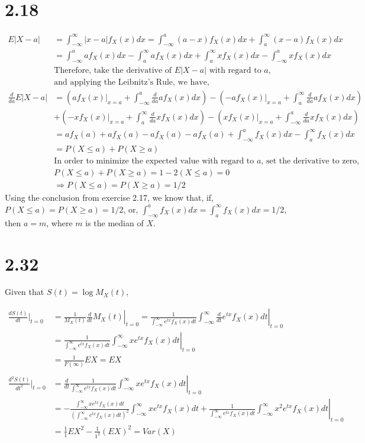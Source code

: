 \documentclass[letterpaper]{article}
\newcommand{\fx}{f_X(x)}
\newcommand{\fxd}{f_X(x)dx}
\newcommand{\intia}{\int_{-\infty}^a}
\newcommand{\intii}{\int_{-\infty}^\infty}
\newcommand{\intai}{\int_a^\infty}
\newcommand{\mgf}{M_X(t)}
\begin{document}
    \section*{2.18}
    \begin{align*}
    E|X-a| & = \int_{-\infty}^\infty |x-a| \fxd
    = \intia (a-x) \fxd + \intai (x-a) \fxd \\
    & = \intia a \fxd - \intai a \fxd + \intai x \fxd - \intia x \fxd \\
    & \text{Therefore, take the derivative of $E|X-a|$ with regard to $a$}, \\
    & \text{and applying the Leibnitz's Rule, we have,}\\
    \frac{d}{da}E|X-a| & = \left(a\fx |_{x=a} + \intia \frac{d}{da} a \fxd
    \right) 
    - \left(-a\fx|_{x=a} + \intai \frac{d}{da} a \fxd \right) \\
    & + \left(-x\fx|_{x=a} + \intai \frac{d}{da} x \fxd \right) 
    - \left(x\fx|_{x=a} + \intia \frac{d}{da} x \fxd \right) \\
    & = af_X(a) + a f_X(a) - af_X(a) - af_X(a) 
    + \intia \fxd - \intai \fxd \\
    & = P(X \le a) + P(X \ge a) \\
    & \text{In order to minimize the expected value with regard to $a$, set the derivative to zero,} \\
    & P(X \le a) + P(X \ge a) = 1 - 2(X \le a) = 0 \\
    & \Rightarrow P(X \le a) = P(X \ge a) = 1/2 
    \end{align*}
    Using the conclusion from exercise 2.17, we know that, if,
    $P(X \le a) = P(X \ge a) = 1/2$, or, $\intia \fxd = \intai \fxd = 1/2$,
    then $a = m$, where $m$ is the median of $X$.

    \section*{2.32}
    Given that $S(t) = \log \mgf$,

    \begin{align*}
    \frac{dS(t)}{dt}|_{t=0} & = \left. \frac{1}{\mgf} \frac{d}{dt} \mgf \right|_{t=0} 
    = \left.\frac{1}{\intii e^{tx}\fx dt} \intii \frac{d}{dt} e^{tx}\fx dt\right|_{t=0} \\
    & = \left. \frac{1}{\intii e^{tx}\fx dt} \intii x e^{tx}\fx dt\right|_{t=0} \\
    & = \frac{1}{F(\infty)} EX = EX\\
    \\
    \frac{d^2S(t)}{dt^2}|_{t=0} & =
    \left. \frac{d}{dt} \frac{1}{\intii e^{tx}\fx dt} \intii x e^{tx}\fx dt\right|_{t=0} \\
    & = \left. -\frac{\intii x e^{tx} \fx dt}{\left(\intii e^{tx} \fx dt\right)^2} \intii x e^{tx} \fx dt + \frac{1}{\intii e^{tx}\fx dt} \intii x^2 e^{tx} \fx dt \right|_{t=0} \\
    & = \frac{1}{1}EX^2 - \frac{1}{1^2} (EX)^2 = Var(X)
    \end{align*}
\end{document}
